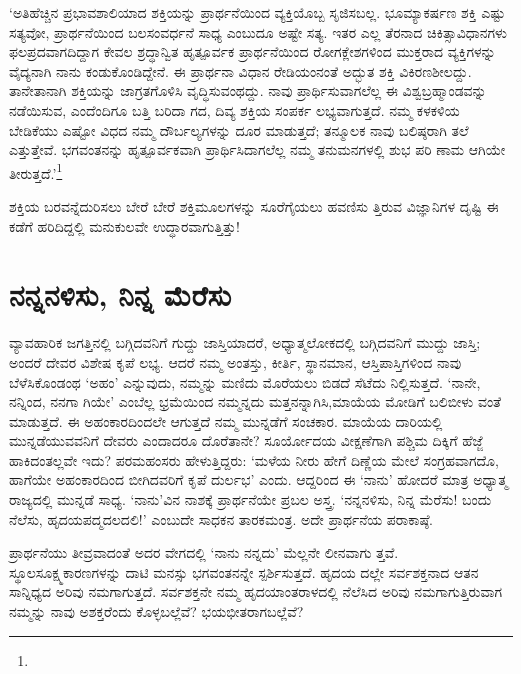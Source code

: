 ‘ಅತಿಹೆಚ್ಚಿನ ಪ್ರಭಾವಶಾಲಿಯಾದ ಶಕ್ತಿಯನ್ನು ಪ್ರಾರ್ಥನೆಯಿಂದ ವ್ಯಕ್ತಿಯೊಬ್ಬ ಸೃಜಿಸಬಲ್ಲ. ಭೂಮ್ಯಾಕರ್ಷಣ ಶಕ್ತಿ ಎಷ್ಟು ಸತ್ಯವೋ, ಪ್ರಾರ್ಥನೆಯಿಂದ ಬಲಸಂವರ್ಧನೆ ಸಾಧ್ಯ ಎಂಬುದೂ ಅಷ್ಟೇ ಸತ್ಯ. ಇತರ ಎಲ್ಲ ತೆರನಾದ ಚಿಕಿತ್ಸಾವಿಧಾನಗಳು ಫಲಪ್ರದವಾಗದಿದ್ದಾಗ ಕೇವಲ ಶ್ರದ್ಧಾನ್ವಿತ ಹೃತ್ಪೂರ್ವಕ ಪ್ರಾರ್ಥನೆಯಿಂದ ರೋಗಕ್ಲೇಶಗಳಿಂದ ಮುಕ್ತರಾದ ವ್ಯಕ್ತಿಗಳನ್ನು ವೈದ್ಯನಾಗಿ ನಾನು ಕಂಡುಕೊಂಡಿದ್ದೇನೆ. ಈ ಪ್ರಾರ್ಥನಾ ವಿಧಾನ ರೇಡಿಯಂನಂತೆ ಅದ್ಭುತ ಶಕ್ತಿ ವಿಕಿರಣಶೀಲದ್ದು. ತಾನೇತಾನಾಗಿ ಶಕ್ತಿಯನ್ನು ಜಾಗ್ರತಗೊಳಿಸಿ ವೃದ್ಧಿಸುವಂಥದ್ದು. ನಾವು ಪ್ರಾರ್ಥಿಸುವಾಗಲೆಲ್ಲ ಈ ವಿಶ್ವಬ್ರಹ್ಮಾಂಡವನ್ನು ನಡೆಯಿಸುವ, ಎಂದೆಂದಿಗೂ ಬತ್ತಿ ಬರಿದಾ ಗದ, ದಿವ್ಯ ಶಕ್ತಿಯ ಸಂಪರ್ಕ ಲಭ್ಯವಾಗುತ್ತದೆ. ನಮ್ಮ ಕಳಕಳಿಯ ಬೇಡಿಕೆಯು ಎಷ್ಟೋ ವಿಧದ ನಮ್ಮ ದೌರ್ಬಲ್ಯಗಳನ್ನು ದೂರ ಮಾಡುತ್ತದೆ; ತನ್ಮೂಲಕ ನಾವು ಬಲಿಷ್ಠರಾಗಿ ತಲೆ ಎತ್ತುತ್ತೇವೆ. ಭಗವಂತನನ್ನು ಹೃತ್ಪೂರ್ವಕವಾಗಿ ಪ್ರಾರ್ಥಿಸಿದಾಗಲೆಲ್ಲ ನಮ್ಮ ತನುಮನಗಳಲ್ಲಿ ಶುಭ ಪರಿ ಣಾಮ ಆಗಿಯೇ ತೀರುತ್ತದೆ.’\footnote{\hfill{}}

ಶಕ್ತಿಯ ಬರವನ್ನೆದುರಿಸಲು ಬೇರೆ ಬೇರೆ ಶಕ್ತಿಮೂಲಗಳನ್ನು ಸೂರೆಗೈಯಲು ಹವಣಿಸು ತ್ತಿರುವ ವಿಜ್ಞಾನಿಗಳ ದೃಷ್ಟಿ ಈ ಕಡೆಗೆ ಹರಿದಿದ್ದಲ್ಲಿ ಮನುಕುಲವೇ ಉದ್ಧಾರವಾಗುತ್ತಿತ್ತು!


\section{ನನ್ನನಳಿಸು, ನಿನ್ನ ಮೆರೆಸು}

ವ್ಯಾವಹಾರಿಕ ಜಗತ್ತಿನಲ್ಲಿ ಬಗ್ಗಿದವನಿಗೆ ಗುದ್ದು ಜಾಸ್ತಿಯಾದರೆ, ಅಧ್ಯಾತ್ಮಲೋಕದಲ್ಲಿ ಬಗ್ಗಿದವನಿಗೆ ಮುದ್ದು ಜಾಸ್ತಿ; ಅಂದರೆ ದೇವರ ವಿಶೇಷ ಕೃಪೆ ಲಭ್ಯ. ಆದರೆ ನಮ್ಮ ಅಂತಸ್ತು, ಕೀರ್ತಿ, ಸ್ಥಾನಮಾನ, ಆಸ್ತಿಪಾಸ್ತಿಗಳಿಂದ ನಾವು ಬೆಳೆಸಿಕೊಂಡಂಥ ‘ಅಹಂ’ ಎನ್ನುವುದು, ನಮ್ಮನ್ನು ಮಣಿದು ಮೊರೆಯಲು ಬಿಡದೆ ಸೆಟೆದು ನಿಲ್ಲಿಸುತ್ತದೆ. ‘ನಾನೇ, ನನ್ನಿಂದ, ನನಗಾ ಗಿಯೇ’ ಎಂಬೆಲ್ಲ ಭ್ರಮೆಯಿಂದ ನಮ್ಮನ್ನದು ಮತ್ತನನ್ನಾಗಿಸಿ,ಮಾಯೆಯ ಮೋಡಿಗೆ ಬಲಿಬೀಳು ವಂತೆ ಮಾಡುತ್ತದೆ. ಈ ಅಹಂಕಾರದಿಂದಲೇ ಆಗುತ್ತದೆ ನಮ್ಮ ಮುನ್ನಡೆಗೆ ಸಂಚಕಾರ. ಮಾಯೆಯ ದಾರಿಯಲ್ಲಿ ಮುನ್ನಡೆಯುವವನಿಗೆ ದೇವರು ಎಂದಾದರೂ ದೊರೆತಾನೇ? ಸೂರ್ಯೋದಯ ವೀಕ್ಷಣೆಗಾಗಿ ಪಶ್ಚಿಮ ದಿಕ್ಕಿಗೆ ಹೆಜ್ಜೆ ಹಾಕಿದಂತಲ್ಲವೇ ಇದು? ಪರಮಹಂಸರು ಹೇಳುತ್ತಿದ್ದರು: ‘ಮಳೆಯ ನೀರು ಹೇಗೆ ದಿಣ್ಣೆಯ ಮೇಲೆ ಸಂಗ್ರಹವಾಗದೊ, ಹಾಗೆಯೇ ಅಹಂಕಾರದಿಂದ ಬೀಗಿದವರಿಗೆ ಕೃಪೆ ದುರ್ಲಭ’ ಎಂದು. ಆದ್ದರಿಂದ ಈ ‘ನಾನು’ ಹೋದರೆ ಮಾತ್ರ ಅಧ್ಯಾತ್ಮ ರಾಜ್ಯದಲ್ಲಿ ಮುನ್ನಡೆ ಸಾಧ್ಯ. ‘ನಾನು’ವಿನ ನಾಶಕ್ಕೆ ಪ್ರಾರ್ಥನೆಯೇ ಪ್ರಬಲ ಅಸ್ತ್ರ. ‘ನನ್ನನಳಿಸು, ನಿನ್ನ ಮೆರೆಸು! ಬಂದು ನೆಲೆಸು, ಹೃದಯಪದ್ಮದಲದಲಿ!’ ಎಂಬುದೇ ಸಾಧಕನ ತಾರಕಮಂತ್ರ. ಅದೇ ಪ್ರಾರ್ಥನೆಯ ಪರಾಕಾಷ್ಠೆ.

ಪ್ರಾರ್ಥನೆಯು ತೀವ್ರವಾದಂತೆ ಅದರ ವೇಗದಲ್ಲಿ ‘ನಾನು ನನ್ನದು’ ಮೆಲ್ಲನೇ ಲೀನವಾಗು ತ್ತವೆ. ಸ್ಥೂಲಸೂಕ್ಷ್ಮಕಾರಣಗಳನ್ನು ದಾಟಿ ಮನಸ್ಸು ಭಗವಂತನನ್ನೇ ಸ್ಪರ್ಶಿಸುತ್ತದೆ. ಹೃದಯ ದಲ್ಲೇ ಸರ್ವಶಕ್ತನಾದ ಆತನ ಸಾನ್ನಿಧ್ಯದ ಅರಿವು ನಮಗಾಗುತ್ತದೆ. ಸರ್ವಶಕ್ತನೇ ನಮ್ಮ ಹೃದಯಾಂತರಾಳದಲ್ಲಿ ನೆಲೆಸಿದ ಅರಿವು ನಮಗಾಗುತ್ತಿರುವಾಗ ನಮ್ಮನ್ನು ನಾವು ಅಶಕ್ತರೆಂದು ಕೊಳ್ಳಬಲ್ಲೆವೆ? ಭಯಭೀತರಾಗಬಲ್ಲೆವೆ?

